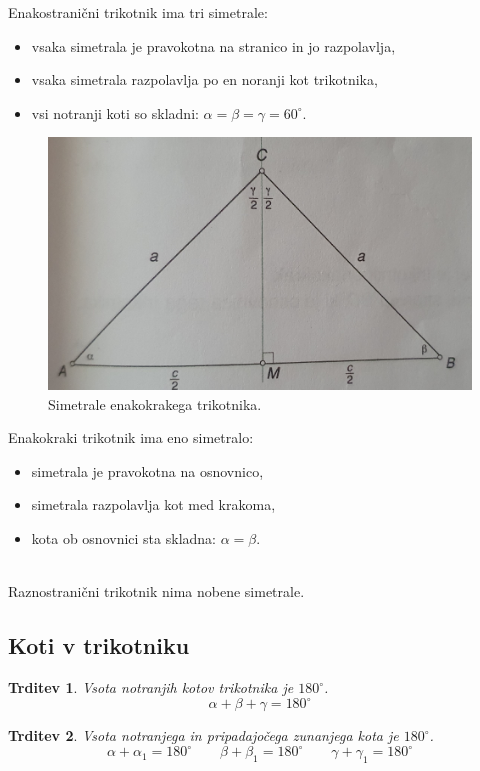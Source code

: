 \documentclass{article}
\newtheorem{trditev}{Trditev}[subsection]
\begin{document}
Enakostranični trikotnik ima tri simetrale:
\begin{itemize}
    \item vsaka simetrala je pravokotna na stranico in jo razpolavlja,
    \item vsaka simetrala razpolavlja po en noranji kot trikotnika,
    \item vsi notranji koti so skladni: $\alpha = \beta = \gamma = 60^\circ$.
\end{itemize}

\begin{figure}[h]
    \includegraphics[width=0.5\linewidth]{simetraleEnakokraki.png}
    \centering
    \caption{Simetrale enakokrakega trikotnika.}
\end{figure}

Enakokraki trikotnik ima eno simetralo:
\begin{itemize}
    \item simetrala je pravokotna na osnovnico,
    \item simetrala razpolavlja kot med krakoma,
    \item kota ob osnovnici sta skladna: $\alpha = \beta$.
\end{itemize}

\ \\
Raznostranični trikotnik nima nobene simetrale.

\pagebreak
\subsection{ Koti v trikotniku }

\begin{trditev}
    Vsota notranjih kotov trikotnika je $180^\circ$.
    \[
        \alpha + \beta + \gamma = 180^\circ
    \]
\end{trditev}

\begin{trditev}
    Vsota notranjega in pripadajočega zunanjega kota je $180^\circ$.
    \[
        \alpha + \alpha_1 = 180^\circ \quad\quad
        \beta + \beta_1 = 180^\circ \quad\quad
        \gamma + \gamma_1 = 180^\circ
    \]
\end{trditev}
\end{document}
